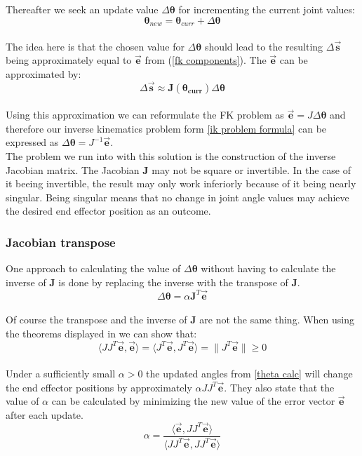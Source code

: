 Thereafter we seek an update value $\Delta\pmb{\theta}$ for incrementing the current joint values:\\
\begin{equation}
\label{theta calc}
\pmb{\theta}_{new}=\pmb{\theta}_{curr}+\Delta\pmb{\theta}
\end{equation}
\\The idea here is that the  chosen value for $\Delta\pmb{\theta}$ should lead to the resulting $\Delta\pmb{\vec{s}}$ being approximately equal to $\vec{\textbf{e}}$ from (\ref{fk components}). The $\vec{\textbf{e}}$ can be approximated by:\\
\begin{equation}
\label{delta s approx}
\Delta\pmb{\vec{s}}\approx \pmb{J(\theta_{curr})}\Delta\pmb{\theta}
\end{equation}
\\Using this approximation  we can reformulate the FK problem as $\pmb{}\vec{\pmb{e}}=J\Delta\pmb{\theta}$ and therefore our inverse kinematics problem form \ref{ik problem formula} can be expressed as $ \Delta\pmb{\theta}=J^{-1}\vec{\pmb{e}}$. \\The problem we run into with this solution is the construction of the inverse Jacobian matrix. The Jacobian \textbf{J} may not be square or invertible. In the case of it beeing invertible, the result may only work inferiorly because of it being nearly singular. Being singular means that no change in joint angle values may achieve the desired end effector position as an outcome.
\subsubsection{Jacobian transpose}
One approach to calculating the value of $\Delta\pmb{\theta}$ without having to calculate the inverse of \textbf{J} is done by replacing the inverse with the transpose of \textbf{J}.\\
\begin{equation}
\label{delta theta transpose}
\Delta\pmb{\theta}=\alpha \pmb{J}^{T}\vec{\pmb{e}}
\end{equation}
\\Of course the transpose and the inverse of \textbf{J} are not the same thing. When using the theorems displayed in \cite{Orin.1984,Wolovich.1984} we can show that:\\ 
\begin{equation}
\label{transpose show}
\langle JJ^{T}\vec{\pmb{e}},\vec{\pmb{e}}\rangle=\langle J^{T}\vec{\pmb{e}},J^{T}\vec{\pmb{e}}\rangle=\|J^{T}\vec{\pmb{e}}\|\geq 0
\end{equation}
\\Under a sufficiently small $\alpha>0$ the updated angles from \ref{theta calc} will change the end effector positions by approximately $\alpha JJ^{T}\vec{\pmb{e}}$. They also state that 
the value of $\alpha$ can be calculated by minimizing the new value of the error vector $\vec{\pmb{e}}$ after each update.\\
\begin{equation}
\label{transpose alpha}
\alpha=\frac{\langle\vec{\pmb{e}},JJ^{T}\vec{\pmb{e}}\rangle}{\langle JJ^{T}\vec{\pmb{e}},JJ^{T}\vec{\pmb{e}}\rangle}
\end{equation}
